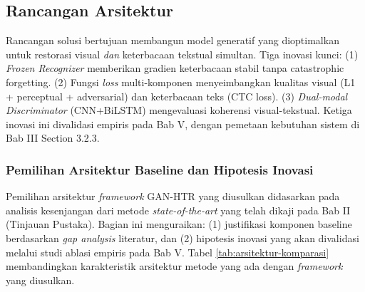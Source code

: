 \subsection{Rancangan Arsitektur} %

Rancangan solusi bertujuan membangun model generatif yang dioptimalkan untuk restorasi visual \textit{dan} keterbacaan tekstual simultan. Tiga inovasi kunci: (1) \textit{Frozen Recognizer} memberikan gradien keterbacaan stabil tanpa catastrophic forgetting. (2) Fungsi \textit{loss} multi-komponen menyeimbangkan kualitas visual (L1 + perceptual + adversarial) dan keterbacaan teks (CTC loss). (3) \textit{Dual-modal Discriminator} (CNN+BiLSTM) mengevaluasi koherensi visual-tekstual. Ketiga inovasi ini divalidasi empiris pada Bab V, dengan pemetaan kebutuhan sistem di Bab III Section 3.2.3.

\subsubsection{Pemilihan Arsitektur Baseline dan Hipotesis Inovasi} %
\label{subsubsec:justifikasi-arsitektur}

Pemilihan arsitektur \textit{framework} GAN-HTR yang diusulkan didasarkan pada analisis kesenjangan dari metode \textit{state-of-the-art} yang telah dikaji pada Bab II (Tinjauan Pustaka). Bagian ini menguraikan: (1) justifikasi komponen baseline berdasarkan \textit{gap analysis} literatur, dan (2) hipotesis inovasi yang akan divalidasi melalui studi ablasi empiris pada Bab V. Tabel \ref{tab:arsitektur-komparasi} membandingkan karakteristik arsitektur metode yang ada dengan \textit{framework} yang diusulkan.

